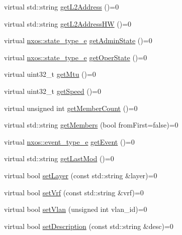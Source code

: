 \begin{DoxyCompactItemize}
virtual std\+::string \mbox{\hyperlink{classnxos_1_1_nx_intf_a8a7f92f0c28178165fd0448c33ff681b}{get\+L2\+Address}} ()=0
\item 
virtual std\+::string \mbox{\hyperlink{classnxos_1_1_nx_intf_a2c057f3f9691205712f70aea8c46f639}{get\+L2\+Address\+HW}} ()=0
\item 
virtual \mbox{\hyperlink{namespacenxos_a7c257059d03188765435b36e95dbb764}{nxos\+::state\+\_\+type\+\_\+e}} \mbox{\hyperlink{classnxos_1_1_nx_intf_a161d3222b8e6f5dff510eef2406996fb}{get\+Admin\+State}} ()=0
\item 
virtual \mbox{\hyperlink{namespacenxos_a7c257059d03188765435b36e95dbb764}{nxos\+::state\+\_\+type\+\_\+e}} \mbox{\hyperlink{classnxos_1_1_nx_intf_abd5291d975d3193c3603efd7ec17deda}{get\+Oper\+State}} ()=0
\item 
virtual uint32\+\_\+t \mbox{\hyperlink{classnxos_1_1_nx_intf_ae0b1d1c5fed67948cb0bbb9040a8f4de}{get\+Mtu}} ()=0
\item 
virtual uint32\+\_\+t \mbox{\hyperlink{classnxos_1_1_nx_intf_ac1fdcdff8093c76a11b06951d2673356}{get\+Speed}} ()=0
\item 
virtual unsigned int \mbox{\hyperlink{classnxos_1_1_nx_intf_a21f7c1b00f609f61ac2d8b68abea1f77}{get\+Member\+Count}} ()=0
\item 
virtual std\+::string \mbox{\hyperlink{classnxos_1_1_nx_intf_a7c197b62e8135c8b78aa8fbf8958f9a2}{get\+Members}} (bool from\+First=false)=0
\item 
virtual \mbox{\hyperlink{namespacenxos_af9a9040b7681199d386e94eb888018cb}{nxos\+::event\+\_\+type\+\_\+e}} \mbox{\hyperlink{classnxos_1_1_nx_intf_a148d8b41d613478294179277a03f3aeb}{get\+Event}} ()=0
\item 
virtual std\+::string \mbox{\hyperlink{classnxos_1_1_nx_intf_aa431b02d46df5e7822fdd0c7a19d93ab}{get\+Last\+Mod}} ()=0
\item 
virtual bool \mbox{\hyperlink{classnxos_1_1_nx_intf_a20e5e820227e592874bf155573e3e700}{set\+Layer}} (const std\+::string \&layer)=0
\item 
virtual bool \mbox{\hyperlink{classnxos_1_1_nx_intf_a91343eb99de8391f1a0e06646ae13b5e}{set\+Vrf}} (const std\+::string \&vrf)=0
\item 
virtual bool \mbox{\hyperlink{classnxos_1_1_nx_intf_af5d5c584845fe42bea0d1d40f9907065}{set\+Vlan}} (unsigned int vlan\+\_\+id)=0
\item 
virtual bool \mbox{\hyperlink{classnxos_1_1_nx_intf_aaaa5e4a9b9161b2908eb9c7979e96f8e}{set\+Description}} (const std\+::string \&desc)=0
\item 

\end{DoxyCompactItemize}
